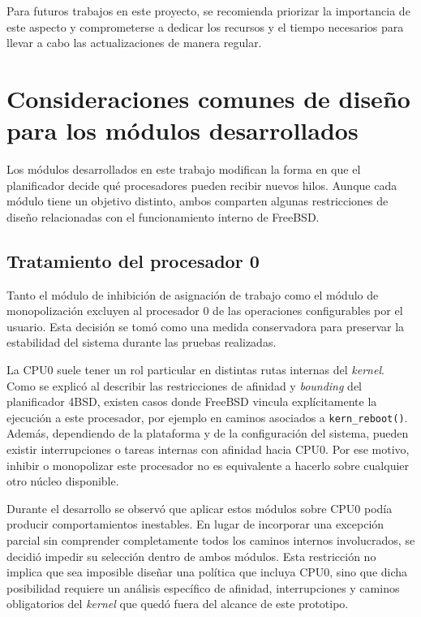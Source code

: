 Para futuros trabajos en este proyecto, se recomienda priorizar la importancia de este aspecto y comprometerse a dedicar los recursos y el tiempo necesarios para llevar a cabo las actualizaciones de manera regular.\par

\section{Consideraciones comunes de diseño para los módulos desarrollados}

Los módulos desarrollados en este trabajo modifican la forma en que el planificador decide qué procesadores pueden recibir nuevos hilos. Aunque cada módulo tiene un objetivo distinto, ambos comparten algunas restricciones de diseño relacionadas con el funcionamiento interno de FreeBSD.\par

\subsection{Tratamiento del procesador 0}\label{sect:cpu0-modulos}

Tanto el módulo de inhibición de asignación de trabajo como el módulo de monopolización excluyen al procesador 0 de las operaciones configurables por el usuario. Esta decisión se tomó como una medida conservadora para preservar la estabilidad del sistema durante las pruebas realizadas.\par

La CPU0 suele tener un rol particular en distintas rutas internas del \textit{kernel}. Como se explicó al describir las restricciones de afinidad y \textit{bounding} del planificador 4BSD, existen casos donde FreeBSD vincula explícitamente la ejecución a este procesador, por ejemplo en caminos asociados a \verb|kern_reboot()|. Además, dependiendo de la plataforma y de la configuración del sistema, pueden existir interrupciones o tareas internas con afinidad hacia CPU0. Por ese motivo, inhibir o monopolizar este procesador no es equivalente a hacerlo sobre cualquier otro núcleo disponible.\par

Durante el desarrollo se observó que aplicar estos módulos sobre CPU0 podía producir comportamientos inestables. En lugar de incorporar una excepción parcial sin comprender completamente todos los caminos internos involucrados, se decidió impedir su selección dentro de ambos módulos. Esta restricción no implica que sea imposible diseñar una política que incluya CPU0, sino que dicha posibilidad requiere un análisis específico de afinidad, interrupciones y caminos obligatorios del \textit{kernel} que quedó fuera del alcance de este prototipo.\par

